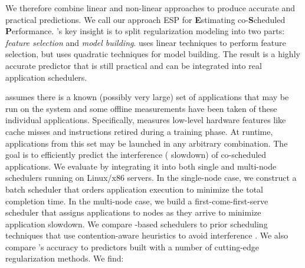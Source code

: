 We therefore combine linear and non-linear approaches to produce
accurate and practical predictions.  We call our approach ESP for
\textbf{E}stimating co-\textbf{S}cheduled \textbf{P}erformance.
\SYSTEMESP{}'s key insight is to split regularization modeling into two
parts: \emph{feature selection} and \emph{model building}.  \SYSTEMESP{}
uses linear techniques to perform feature selection, but uses
quadratic techniques for model building.  The result is a highly
accurate predictor that is still practical and can be integrated into
real application schedulers.

\SYSTEMESP{} assumes there is a known (possibly very large) set of
applications that may be run on the system and some offline
measurements have been taken of these individual applications.
Specifically, \SYSTEMESP{} measures low-level hardware features like
cache misses and instructions retired during a training phase.  At
runtime, applications from this set may be launched in any arbitrary
combination.  The goal is to efficiently predict the interference (\ie
slowdown) of co-scheduled applications.
We evaluate \SYSTEMESP{} by integrating it into both single and
multi-node schedulers running on Linux/x86 servers.  In the
single-node case, we construct a batch scheduler that orders
application execution to minimize the total completion time.  In the
multi-node case, we build a first-come-first-serve scheduler that
assigns applications to nodes as they arrive to minimize application
slowdown.  We compare \SYSTEMESP{}-based schedulers to prior scheduling
techniques that use contention-aware heuristics to avoid interference
\cite{resense,merkel2010resource,Merlin}.  We also compare \SYSTEMESP{}'s
accuracy to predictors built with a number of cutting-edge
regularization methods. We find:
